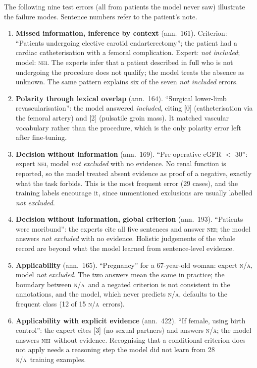 \documentclass[conference]{IEEEtran}
\newcommand{\NEI}{\textsc{nei}}
\newcommand{\NA}{\textsc{n/a}}
\begin{document}
The following nine test errors (all from patients the model never saw) illustrate the failure modes. Sentence numbers refer to the patient's note.

\begin{enumerate}
\item \textbf{Missed information, inference by context} (ann.\ 161). Criterion: ``Patients undergoing elective carotid endarterectomy''; the patient had a cardiac catheterisation with a femoral complication. Expert: \emph{not included}; model: \NEI. The experts infer that a patient described in full who is not undergoing the procedure does not qualify; the model treats the absence as unknown. The same pattern explains six of the seven \emph{not included} errors.
\item \textbf{Polarity through lexical overlap} (ann.\ 164). ``Surgical lower-limb revascularisation'': the model answered \emph{included}, citing [0] (catheterisation via the femoral artery) and [2] (pulsatile groin mass). It matched vascular vocabulary rather than the procedure, which is the only polarity error left after fine-tuning.
\item \textbf{Decision without information} (ann.\ 169). ``Pre-operative eGFR $<$ 30'': expert \NEI, model \emph{not excluded} with no evidence. No renal function is reported, so the model treated absent evidence as proof of a negative, exactly what the task forbids. This is the most frequent error (29 cases), and the training labels encourage it, since unmentioned exclusions are usually labelled \emph{not excluded}.
\item \textbf{Decision without information, global criterion} (ann.\ 193). ``Patients were moribund'': the experts cite all five sentences and answer \NEI; the model answers \emph{not excluded} with no evidence. Holistic judgements of the whole record are beyond what the model learned from sentence-level evidence.
\item \textbf{Applicability} (ann.\ 165). ``Pregnancy'' for a 67-year-old woman: expert \NA, model \emph{not excluded}. The two answers mean the same in practice; the boundary between \NA\ and a negated criterion is not consistent in the annotations, and the model, which never predicts \NA, defaults to the frequent class (12 of 15 \NA\ errors).
\item \textbf{Applicability with explicit evidence} (ann.\ 422). ``If female, using birth control'': the expert cites [3] (no sexual partners) and answers \NA; the model answers \NEI\ without evidence. Recognising that a conditional criterion does not apply needs a reasoning step the model did not learn from 28 \NA\ training examples.

\end{enumerate}
\end{document}
